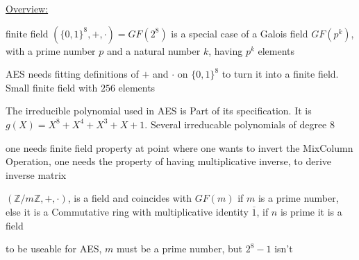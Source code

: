 \documentclass[landscape, a4paper]{article}
\begin{document}
\begin{minipage}[t]{0.198\pagewidth}
	\begin{betterlist}
		\item \underline{Overview:}
		\begin{betterlist}
			\item \alert{finite field} $(\{0, 1\}^8, +, \cdot)=GF(2^8)$ is a special case of a Galois field $GF(p^k)$, with a prime number $p$ and a natural number $k$, having $p^k$ elements
			\begin{betterlist}
				\item AES needs fitting definitions of $+$ and $\cdot$ on $\{0, 1\}^8$ to turn it into a \alert{finite field}. Small finite field with $256$ elements
				\item The irreducible polynomial used in AES is Part of its specification. It is $g(X) = X^8 + X^4 + X^3 + X + 1$. Several irreducable polynomials of degree $8$
				\item one needs finite field property at point where one wants to invert the MixColumn Operation, one needs the property of having multiplicative inverse, to derive inverse matrix
			\end{betterlist}
			\item $(\mathbb{Z}/m\mathbb{Z}, +, \cdot)$, is a \alert{field} and coincides with $GF(m)$ if $m$ is a prime number, else it is a Commutative ring with multiplicative identity $\overline{1}$, if $n$ is prime it is a field
			\begin{betterlist}
				\item to be useable for AES, $m$ must be a prime number, but $2^8-1$ isn't

\end{betterlist}
\end{betterlist}
\end{betterlist}
\end{minipage}
\end{document}

